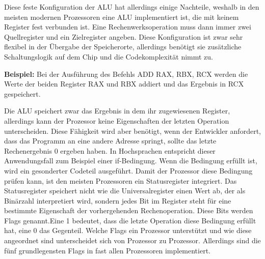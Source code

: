 \documentclass[a4paper,12pt]{article}
\begin{document}
\noindent Diese feste Konfiguration der ALU hat allerdings einige Nachteile, weshalb in den meisten modernen Prozessoren eine ALU implementiert ist, die mit keinem Register fest verbunden ist. Eine Rechenwerksoperation muss dann immer zwei Quellregister und ein Zielregister angeben. Diese Konfiguration ist zwar sehr flexibel in der Übergabe der Speicherorte, allerdings benötigt sie zusätzliche Schaltungslogik auf dem Chip und die Codekomplexität nimmt zu.

\par\bigskip
\noindent \textbf{Beispiel:} Bei der Ausführung des Befehls ADD RAX, RBX, RCX werden die Werte der beiden Register RAX und RBX addiert und das Ergebnis in RCX gespeichert.

\par\smallskip\noindent Die ALU speichert zwar das Ergebnis in dem ihr zugewiesenen Register, allerdings kann der Prozessor keine Eigenschaften der letzten Operation unterscheiden. Diese Fähigkeit wird aber benötigt, wenn der Entwickler anfordert, dass das Programm an eine andere Adresse springt, sollte das letzte Rechenergebnis 0 ergeben haben. In Hochsprachen entspricht dieser Anwendungsfall zum Beispiel einer if-Bedingung. Wenn die Bedingung erfüllt ist, wird ein gesonderter Codeteil ausgeführt. Damit der Prozessor diese Bedingung prüfen kann, ist den meisten Prozessoren ein Statusregister integriert. Das Statusregister speichert nicht wie die Universalregister einen Wert ab, der als Binärzahl interpretiert wird, sondern jedes Bit im Register steht für eine bestimmte Eigenschaft der vorhergehenden Rechenoperation. Diese Bits werden Flags genannt.\newline Eine 1 bedeutet, dass die letzte Operation diese Bedingung erfüllt hat, eine 0 das Gegenteil. Welche Flags ein Prozessor unterstützt und wie diese angeordnet sind unterscheidet sich von Prozessor zu Prozessor. Allerdings sind die fünf grundlegensten Flags in fast allen Prozessoren implementiert.
\end{document}
